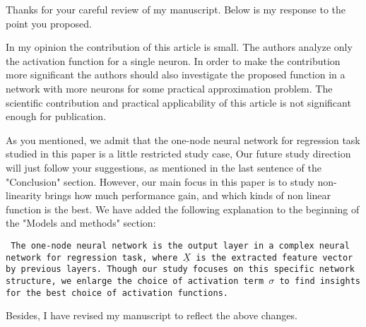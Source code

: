 \documentclass[answers]{exam}
\begin{document}
\pagestyle{empty}
Thanks for your careful review of my manuscript. Below is my response to the point you proposed.
\begin{questions}
\question
In my opinion the contribution of this article is small. The authors analyze only the activation function for a single neuron. In order to make the contribution more significant the authors should also investigate the proposed function in a network with more neurons for some practical approximation problem. The scientific contribution and practical applicability of this article is not significant enough for publication.
\begin{solution}
    As you mentioned, we admit that the one-node neural network for regression task studied in this paper is a little restricted study case,
    Our future study direction will just follow your suggestions, as mentioned in the last sentence of the "Conclusion" section.
    However, our main focus in this paper is to study non-linearity brings how much performance gain, and which kinds of non linear function is the
    best. We have added the following explanation to the beginning of the "Models and methods" section:

    \texttt{
    The one-node neural network is the output layer in a complex neural network for regression task, where
    $\underline{X}$ is the extracted feature vector by previous layers.
    Though our study focuses on this specific network structure, we enlarge the choice of activation term $\sigma$ to find insights
    for the best choice of activation functions.
    }

\end{solution}
\end{questions}
Besides, I have revised my manuscript to reflect the above changes.
\end{document}
